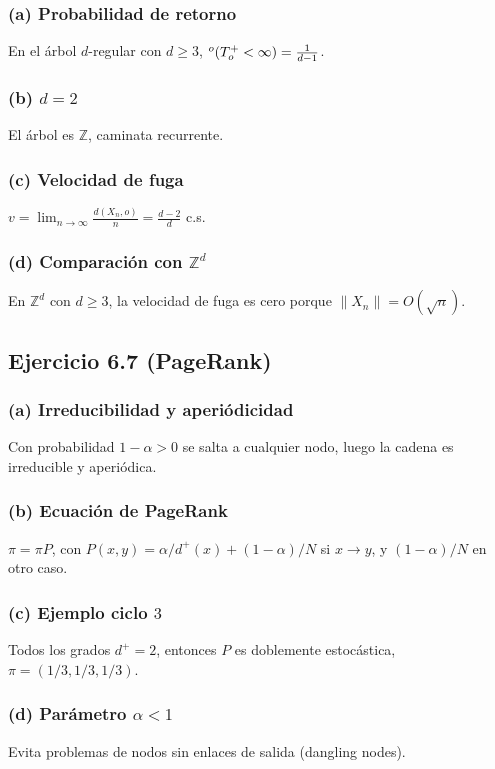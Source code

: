 \documentclass[12pt]{article}
\let\P\relax
\newcommand{\P}{\mathbb{P}}
\newcommand{\Z}{\mathbb{Z}}
\newcommand{\1}{\mathbf{1}}
\begin{document}
\subsubsection*{(a) Probabilidad de retorno}
En el \'arbol $d$-regular con $d\ge3$, $\P^o(T_o^+<\infty)=\frac{1}{d-1}$.

\subsubsection*{(b) $d=2$}
El \'arbol es $\Z$, caminata recurrente.

\subsubsection*{(c) Velocidad de fuga}
$v=\lim_{n\to\infty}\frac{d(X_n,o)}{n}=\frac{d-2}{d}$ c.s.

\subsubsection*{(d) Comparaci\'on con $\Z^d$}
En $\Z^d$ con $d\ge3$, la velocidad de fuga es cero porque $\|X_n\|=O(\sqrt{n})$.

\subsection{Ejercicio 6.7 (PageRank)}

\subsubsection*{(a) Irreducibilidad y aperi\'odicidad}
Con probabilidad $1-\alpha>0$ se salta a cualquier nodo, luego la cadena es irreducible y aperi\'odica.

\subsubsection*{(b) Ecuaci\'on de PageRank}
$\pi=\pi P$, con $P(x,y)=\alpha/d^+(x)+(1-\alpha)/N$ si $x\to y$, y $(1-\alpha)/N$ en otro caso.

\subsubsection*{(c) Ejemplo ciclo $3$}
Todos los grados $d^+=2$, entonces $P$ es doblemente estoc\'astica, $\pi=(1/3,1/3,1/3)$.

\subsubsection*{(d) Par\'ametro $\alpha<1$}
Evita problemas de nodos sin enlaces de salida (dangling nodes).
\end{document}
